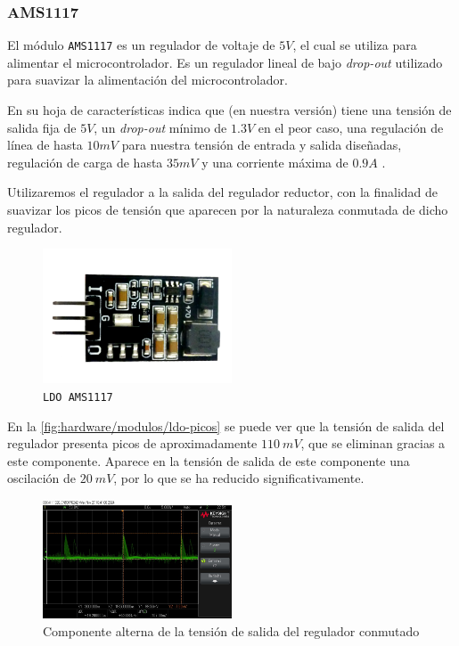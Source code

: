 \subsubsection{AMS1117}

El módulo \texttt{AMS1117} es un regulador de voltaje de $5 V$, el cual se utiliza para alimentar el microcontrolador. Es un regulador lineal de bajo \textit{drop-out} utilizado para suavizar la alimentación del microcontrolador. 

En su hoja de características indica que (en nuestra versión) tiene una tensión de salida fija de $5 V$, un \textit{drop-out} mínimo de $1.3 V$ en el peor caso, una regulación de línea de hasta $10 mV$ para nuestra tensión de entrada y salida diseñadas, regulación de carga de hasta $35 mV$ y una corriente máxima de $0.9 A$ \cite{advancedmonolithicsystemsAMS1117}.

Utilizaremos el regulador a la salida del regulador reductor, con la finalidad de suavizar los picos de tensión que aparecen por la naturaleza conmutada de dicho regulador.

\begin{figure}[H]
    \centering
    \includegraphics[width=0.5\textwidth]{images/2-hardware/componentes/AMS1117.png}
    \caption{\texttt{LDO AMS1117}}
    \label{fig:hardware/modulos/ldo-ams1117}
\end{figure}

En la \autoref{fig:hardware/modulos/ldo-picos} se puede ver que la tensión de salida del regulador presenta picos de aproximadamente $110\ mV$, que se eliminan gracias a este componente. Aparece en la tensión de salida de este componente una oscilación de $20\ mV$, por lo que se ha reducido significativamente.

\begin{figure}[H]
    \centering
    \includegraphics[width=0.5\textwidth]{images/2-hardware/componentes/ldo/picosSinLDO.jpg}
    \caption{Componente alterna de la tensión de salida del regulador conmutado}
    \label{fig:hardware/modulos/ldo-picos}
\end{figure}

